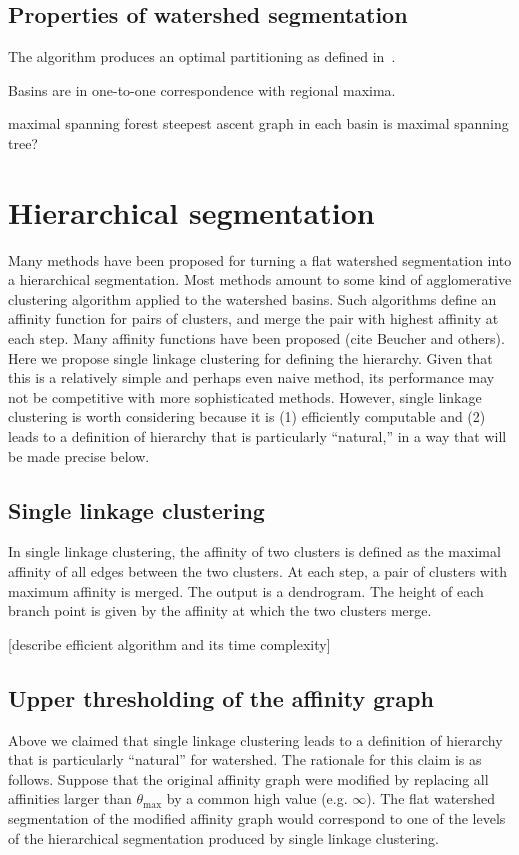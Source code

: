\documentclass{article}
\begin{document}
\subsection{Properties of watershed segmentation}
The algorithm produces an optimal partitioning as defined
in~\cite{Cousty2009}.

Basins are in one-to-one correspondence with regional maxima.

maximal spanning forest
steepest ascent graph in each basin is maximal spanning tree?

\section{Hierarchical segmentation}
Many methods have been proposed for turning a flat watershed
segmentation into a hierarchical segmentation.  Most methods amount to
some kind of agglomerative clustering algorithm applied to the
watershed basins.  Such algorithms define an affinity function for
pairs of clusters, and merge the pair with highest affinity at each
step.  Many affinity functions have been proposed
\cite{Najman1996}(cite Beucher and others).  Here we propose single
linkage clustering for defining the hierarchy.  Given that this is a
relatively simple and perhaps even naive method, its performance may
not be competitive with more sophisticated methods. However, single
linkage clustering is worth considering because it is (1) efficiently
computable and (2) leads to a definition of hierarchy that is
particularly ``natural,'' in a way that will be made precise below.

\subsection{Single linkage clustering}
In single linkage clustering, the affinity of two clusters is defined
as the maximal affinity of all edges between the two clusters.  At
each step, a pair of clusters with maximum affinity is merged.  The
output is a dendrogram.  The height of each branch point is given by
the affinity at which the two clusters merge.

[describe efficient algorithm and its time complexity]


\subsection{Upper thresholding of the affinity graph}
Above we claimed that single linkage clustering leads to a definition
of hierarchy that is particularly ``natural'' for watershed.  The
rationale for this claim is as follows.  Suppose that the original
affinity graph were modified by replacing all affinities larger than
$\theta_{\max}$ by a common high value (e.g. $\infty$).  The flat watershed
segmentation of the modified affinity graph would correspond to one of
the levels of the hierarchical segmentation produced by single linkage
clustering.
\end{document}
